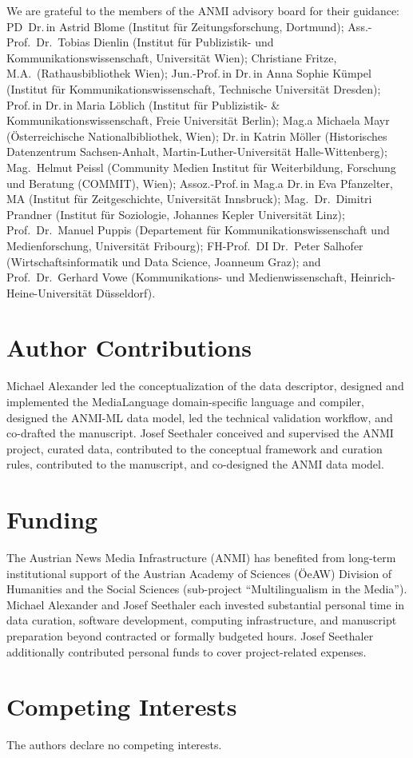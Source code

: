 \documentclass[11pt]{article}
\begin{document}
We are grateful to the members of the ANMI advisory board for their guidance: PD~Dr.\,in Astrid Blome (Institut f\"ur Zeitungsforschung, Dortmund); Ass.-Prof.~Dr.~Tobias Dienlin (Institut f\"ur Publizistik- und Kommunikationswissenschaft, Universit\"at Wien); Christiane Fritze, M.A.\ (Rathausbibliothek Wien); Jun.-Prof.\,in Dr.\,in Anna Sophie K\"umpel (Institut f\"ur Kommunikationswissenschaft, Technische Universit\"at Dresden); Prof.\,in Dr.\,in Maria L\"oblich (Institut f\"ur Publizistik- \& Kommunikationswissenschaft, Freie Universit\"at Berlin); Mag.a Michaela Mayr (\"Osterreichische Nationalbibliothek, Wien); Dr.\,in Katrin M\"oller (Historisches Datenzentrum Sachsen-Anhalt, Martin-Luther-Universit\"at Halle-Wittenberg); Mag.~Helmut Peissl (Community Medien Institut f\"ur Weiterbildung, Forschung und Beratung (COMMIT), Wien); Assoz.-Prof.\,in Mag.a Dr.\,in Eva Pfanzelter, MA (Institut f\"ur Zeitgeschichte, Universit\"at Innsbruck); Mag.~Dr.~Dimitri Prandner (Institut f\"ur Soziologie, Johannes Kepler Universit\"at Linz); Prof.~Dr.~Manuel Puppis (Departement f\"ur Kommunikationswissenschaft und Medienforschung, Universit\"at Fribourg); FH-Prof.~DI Dr.~Peter Salhofer (Wirtschaftsinformatik und Data Science, Joanneum Graz); and Prof.~Dr.~Gerhard Vowe (Kommunikations- und Medienwissenschaft, Heinrich-Heine-Universit\"at D\"usseldorf).

\section*{Author Contributions}

Michael Alexander led the conceptualization of the data descriptor, designed and implemented the MediaLanguage domain-specific language and compiler, designed the ANMI-ML data model, led the technical validation workflow, and co-drafted the manuscript. Josef Seethaler conceived and supervised the ANMI project, curated data, contributed to the conceptual framework and curation rules, contributed to the manuscript, and co-designed the ANMI data model.

\section*{Funding}

The Austrian News Media Infrastructure (ANMI) has benefited from long-term institutional support of the Austrian Academy of Sciences (\"OeAW) Division of Humanities and the Social Sciences (sub-project ``Multilingualism in the Media''). Michael Alexander and Josef Seethaler each invested substantial personal time in data curation, software development, computing infrastructure, and manuscript preparation beyond contracted or formally budgeted hours. Josef Seethaler additionally contributed personal funds to cover project-related expenses.


\section*{Competing Interests}

The authors declare no competing interests.



\end{document}
